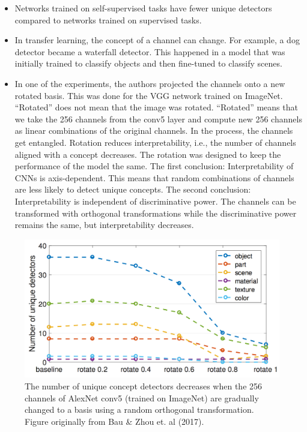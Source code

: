\documentclass[12pt,]{krantz}
\providecommand{\tightlist}{%
  \setlength{\itemsep}{0pt}\setlength{\parskip}{0pt}}
\begin{document}
\begin{itemize}
\tightlist
\item
  Networks trained on self-supervised tasks have fewer unique detectors
  compared to networks trained on supervised tasks.
\item
  In transfer learning, the concept of a channel can change. For
  example, a dog detector became a waterfall detector. This happened in
  a model that was initially trained to classify objects and then
  fine-tuned to classify scenes.
\item
  In one of the experiments, the authors projected the channels onto a
  new rotated basis. This was done for the VGG network trained on
  ImageNet. ``Rotated'' does not mean that the image was rotated.
  ``Rotated'' means that we take the 256 channels from the conv5 layer
  and compute new 256 channels as linear combinations of the original
  channels. In the process, the channels get entangled. Rotation reduces
  interpretability, i.e., the number of channels aligned with a concept
  decreases. The rotation was designed to keep the performance of the
  model the same. The first conclusion: Interpretability of CNNs is
  axis-dependent. This means that random combinations of channels are
  less likely to detect unique concepts. The second conclusion:
  Interpretability is independent of discriminative power. The channels
  can be transformed with orthogonal transformations while the
  discriminative power remains the same, but interpretability decreases.
\end{itemize}

\begin{figure}

{\centering \includegraphics[width=\textwidth]{images/rotation-dissect} 

}

\caption{The number of unique concept detectors decreases when the 256 channels of AlexNet conv5 (trained on ImageNet) are gradually changed to a basis using a random orthogonal transformation. Figure originally from Bau \& Zhou et. al (2017).}\label{fig:unnamed-chunk-59}
\end{figure}
\end{document}
